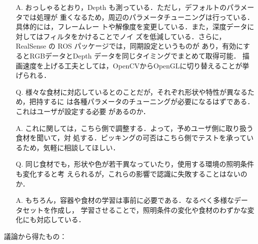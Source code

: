 \documentclass{jsarticle}
\begin{document}
\begin{itemize}
  \item [A.]おっしゃるとおり，Depth も測っている．ただし，デフォルトのパラメータでは処理が
  \hspace*{5.5zw}重くなるため，周辺のパラメータチューニングは行っている．具体的には，フレームレー
  \hspace*{5.5zw}トや解像度を変更している．また，深度データに対してはフィルタをかけることでノイ
  \hspace*{5.5zw}ズを低減している．さらに，RealSense の ROS パッケージでは，同期設定というものが
  \hspace*{5.5zw}あり，有効にするとRGBデータとDepth データを同じタイミングでまとめて取得可能．
  \hspace*{5.5zw}描画速度を上げる工夫としては，OpenCVからOpenGLに切り替えることが挙げられる．\\
  \vspace*{1zh}


  \item [Q.]様々な食材に対応しているとのことだが，それぞれ形状や特性が異なるため，把持するに
  \hspace*{5.5zw}は各種パラメータのチューニングが必要になるはずである．これはユーザが設定する必要
  \hspace*{5.5zw}があるのか．
  \vspace*{1zh}

  \item [A.]これに関しては，こちら側で調整する．よって，予めユーザ側に取り扱う食材を聞いて，対
  \hspace*{5.5zw}処する．ピッキングの可否はこちら側でテストを承っているため，気軽に相談してほしい．\\

  \vspace*{1zh}


  \item [Q.]同じ食材でも，形状や色が若干異なっていたり，使用する環境の照明条件も変化すると考
  \hspace*{5.5zw}えられるが，これらの影響で認識に失敗することはないのか．
  \vspace*{1zh}

  \item [A.]もちろん，容器や食材の学習は事前に必要である．なるべく多様なデータセットを作成し，
  \hspace*{5.5zw}学習させることで，照明条件の変化や食材のわずかな変化にも対応している．\\
\end{itemize}

\hspace*{4.7zw}議論から得たもの：
\end{document}
